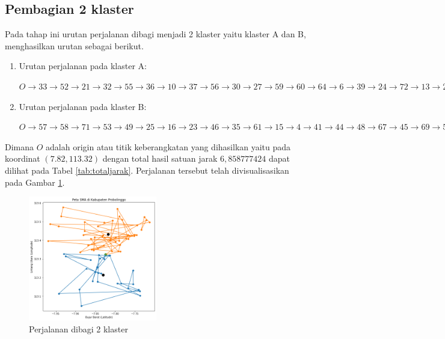 \subsection{Pembagian 2 klaster}

Pada tahap ini urutan perjalanan dibagi menjadi 2 klaster yaitu klaster A dan B, menghasilkan urutan sebagai berikut.

\begin{enumerate}
\item Urutan perjalanan pada klaster A:

$O \to 33 \to 52 \to 21 \to 32 \to 55 \to 36 \to 10 \to 37 \to 56 \to 30 \to 27 \to 59 \to 60 \to 64 \to 6 \to 39 \to 24 \to 72 \to 13 \to 29 \to 11 \to 63 \to 9 \to 17 \to 47 \to 38 \to O$

\item Urutan perjalanan pada klaster B:

$O \to 57 \to 58 \to 71 \to 53 \to 49 \to 25 \to 16 \to 23 \to 46 \to 35 \to 61 \to 15 \to 4 \to 41 \to 44 \to 48 \to 67 \to 45 \to 69 \to 5 \to 8 \to 42 \to 50 \to 22 \to 51 \to 74 \to 26 \to 19 \to 34 \to 43 \to 65 \to 12 \to 28 \to 14 \to 70 \to 66 \to 3 \to 40 \to 20 \to 62 \to 31 \to 18 \to 7 \to 54 \to 68 \to 73 \to 75 \to 2 \to 1 \to O$

\end{enumerate}

Dimana $O$ adalah origin atau titik keberangkatan yang dihasilkan yaitu pada koordinat $(7.82, 113.32)$ dengan total hasil satuan jarak $6,858777424$ dapat dilihat pada Tabel \ref{tab:totaljarak}. Perjalanan tersebut telah divisualisasikan pada Gambar \ref{fig:hasil_mtsp2}.

\begin{figure}[H]
\centering
\includegraphics[width=0.5\textwidth]{Gambar/hasil_mtsp/2}
\caption{Perjalanan dibagi 2 klaster}
\label{fig:hasil_mtsp2}
\end{figure}

